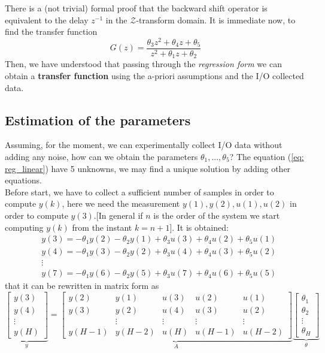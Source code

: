 \noindent
There is a (not trivial) formal proof that the backward shift operator is equivalent to the delay $z^{-1}$ in the $\mathcal{Z}$-transform domain. It is immediate now, to find the transfer function 
\begin{equation}
    G(z) = \frac{
        \theta_3 z^2 + \theta_4z + \theta_5
    }{
        z^{2}+\theta_1z + \theta_2
    }
\end{equation}
Then, we have understood that passing through the \textit{regression form} we can obtain a \textbf{transfer function} using the a-priori assumptions and the I/O collected data.

\subsection{Estimation of the parameters}
Assuming, for the moment, we can experimentally collect I/O data without adding any noise, how can we obtain the parameters $\theta_1, ..., \theta_5$? The equation (\ref{eq: reg_linear}) have 5 unknowns, we may find a unique solution by adding other equations. \\
Before start, we have to collect a sufficient number of samples in order to compute $y(k)$, here we need the measurement $y(1), y(2), u(1), u(2)$ in order to compute $y(3)$.[In general if $n$ is the order of the system we start computing $y(k)$ from the instant $k=n+1$]. It is obtained:
\begin{align*}
    &y(3)=-\theta_1y(2)-\theta_2y(1)+\theta_3u(3)+\theta_4u(2)+\theta_5u(1)\\
    &y(4)=-\theta_1y(3)-\theta_2y(2)+\theta_3u(4)+\theta_4u(3)+\theta_5u(2)\\
    &\vdots\\
    &y(7) = -\theta_1y(6)-\theta_2y(5)+\theta_3u(7)+
    \theta_4u(6)+\theta_5u(5)
\end{align*}
that it can be rewritten in matrix form as
\begin{equation} \label{eq:sys_eq}
    \underbrace{\begin{bmatrix}
        y(3)\\y(4)\\\vdots\\y(H)
    \end{bmatrix}}_{y} 
    =\underbrace{ 
    \begin{bmatrix}
        y(2)&y(1)&u(3)&u(2)&u(1)\\
        y(3)&y(2)&u(4)&u(3)&u(2)\\
        &\vdots&\vdots&\vdots&\vdots\\
        y(H-1)&y(H-2)&u(H)&u(H-1)&u(H-2)
    \end{bmatrix}}_{A} \underbrace{\begin{bmatrix}
        \theta_1\\\theta_2\\\vdots\\\theta_H
    \end{bmatrix}}_{\theta}
\end{equation}
